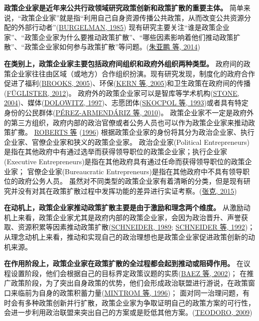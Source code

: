 \documentclass[
  12pt,
]{ctexart}
\begin{document}
\textbf{政策企业家是近年来公共行政领域研究政策创新和政策扩散的重要主体。}
简单来说，``政策企业家''就是指``利用自己自身资源传播公共政策，从而改变公共资源分配的外部行动者''(\protect\hyperlink{ref-Burgelman1985}{BURGELMAN, 1985})
现有研究主要关注``谁是政策企业家''、``政策企业家为什么要推动政策扩散''、``哪些因素影响着他们推动政策扩散''、``政策企业家如何参与政策扩散''等问题。(\protect\hyperlink{ref-ZhuYaPengXiaoDiWen2014}{朱亚鹏 等, 2014})

\textbf{在类别上，政策企业家主要包括政府间组织和政府外组织两种类型。}
政府间的政策企业家往往由区域（或地方）合作组织扮演。现有研究发现，制度化的政府合作促进了福利(\protect\hyperlink{ref-Brooks2005}{BROOKS, 2005})、环保(\protect\hyperlink{ref-KernEtAl2005}{KERN 等, 2005})和卫生政策在政府间的传播(\protect\hyperlink{ref-Fuglister2012}{FÜGLISTER, 2012})。
政府外的政策企业家可以是智库等学术机构(\protect\hyperlink{ref-Stone2004}{STONE, 2004})、媒体(\protect\hyperlink{ref-Dolowitz1997}{DOLOWITZ, 1997})、志愿团体(\protect\hyperlink{ref-SkocpolEtAl1993}{SKOCPOL 等, 1993})或者具有特定身份的公民群体(\protect\hyperlink{ref-Perez-ArmendarizCrow2010}{PÉREZ-ARMENDÁRIZ 等, 2010})。
政策企业家不一定是政府外的第三方组织，政府内部的政治官僚或者公务人员也可以作为政策企业家来推动政策扩撒。
\protect\hyperlink{ref-RobertsKing1996}{ROBERTS 等} (\protect\hyperlink{ref-RobertsKing1996}{1996}) 根据政策企业家的身份将其分为政治企业家、执行企业家、官僚企业家和狭义的政策企业家。
政治企业家(Political Entrepreneurs)是指在其他政府中有通过选举而获得领导职位的政策企业家；执行企业家(Executive Entrepreneurs)是指在其他政府具有通过任命而获得领导职位的政策企业家；
官僚企业家(Bureaucratic Entrepreneurs)是指在其他政府中不具有领导职位的政府公务人员。
虽然对不同类型的政策企业家有着清晰的分类，但是现有研究并没有对其在政策扩散过程中发挥功能的差异进行实证考察。(\protect\hyperlink{ref-ZhangKe2015}{张克, 2015})

\textbf{在动机上，政策企业家推动政策扩散主要是由于激励和理念两个维度。}
从激励动机上来看，政策企业家尤其是政府内部的政策企业家，会因为政治晋升、声誉获取、资源积累等因素推动政策扩散(\protect\hyperlink{ref-Schneider1989}{SCHNEIDER, 1989}; \protect\hyperlink{ref-SchneiderTeske1992}{SCHNEIDER 等, 1992})；
从理念动机上来看，推动和实现自己的政治理想也是政策企业家促进政策创新的动机来源。

\textbf{在作用阶段上，政策企业家在政策扩散的全过程都会起到推动或阻碍作用。}
在议程设置阶段，他们会根据自己的目标界定政策议题的实质(\protect\hyperlink{ref-BaezAbolafia2002}{BAEZ 等, 2002})；
在推广政策阶段，为了突出自身政策的优势，他们会形成政治联盟进行游说，在政策窗口来临前为自身的政策积蓄力量(\protect\hyperlink{ref-MintromVergari1996}{MINTROM 等, 1996})；
面对同一治理问题，有时会有多种政策创新并行扩散，政策企业家为争取证明自己的政策方案的可行性，会进一步利用政治联盟来突出自己的方案或是贬低其他方案。(\protect\hyperlink{ref-Teodoro2009}{TEODORO, 2009})
\end{document}
